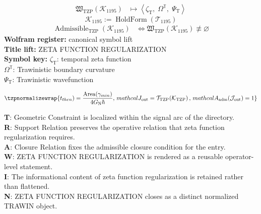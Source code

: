\noindent
\begin{minipage}[t]{0.48\linewidth}
\begingroup
\small
\[
\begin{aligned}
\mathfrak{W}_{\mathrm{TZP}}\!\left(\mathcal{K}_{1195}\right)
&\longmapsto
\left\langle \zeta_{\mathrm{T}},\; \Omega^{\mathbb{T}},\; \Psi_{\mathrm{T}} \right\rangle
\end{aligned}
\]
\[
\mathcal{K}_{1195}
:=
\operatorname{HoldForm}\!\left(\mathcal{T}_{1195}\right)
\]
\[
\begin{aligned}
\operatorname{Admissible}_{\mathrm{TZP}}\!\left(\mathcal{K}_{1195}\right)
&\Longleftrightarrow
\mathfrak{W}_{\mathrm{TZP}}\!\left(\mathcal{K}_{1195}\right)\not\equiv\varnothing
\end{aligned}
\]
\textbf{Wolfram register:} canonical symbol lift\\
\textbf{Title lift:} ZETA FUNCTION REGULARIZATION\\
\textbf{Symbol key:} \(\zeta_{\mathrm{T}}\): temporal zeta function\\ \(\Omega^{\mathbb{T}}\): Trawinistic boundary curvature\\ \(\Psi_{\mathrm{T}}\): Trawinistic wavefunction
\par
\endgroup
\end{minipage}\hfill
\begin{minipage}[t]{0.48\linewidth}
\[
\tzpnormalizewrap{t_{then}) = \frac{\text{Area}(\gamma_{min})}{4 G_{\mathrm{N}} \hbar},\,mathcal{J}_{\mathrm{out}} = \mathcal{T}_{\mathrm{TZP}}\!\left(\mathcal{K}_{\mathrm{TZP}}\right),\,mathcal{A}_{\mathrm{adm}}\!\left(\mathcal{J}_{\mathrm{out}}\right)=1}
\]

\small
\textbf{T}: Geometric Constraint is localized within the signal arc of the directory.\\
\textbf{R}: Support Relation preserves the operative relation that zeta function regularization requires.\\
\textbf{A}: Closure Relation fixes the admissible closure condition for the entry.\\
\textbf{W}: ZETA FUNCTION REGULARIZATION is rendered as a reusable operator-level statement.\\
\textbf{I}: The informational content of zeta function regularization is retained rather than flattened.\\
\textbf{N}: ZETA FUNCTION REGULARIZATION closes as a distinct normalized TRAWIN object.
\normalsize
\end{minipage}

